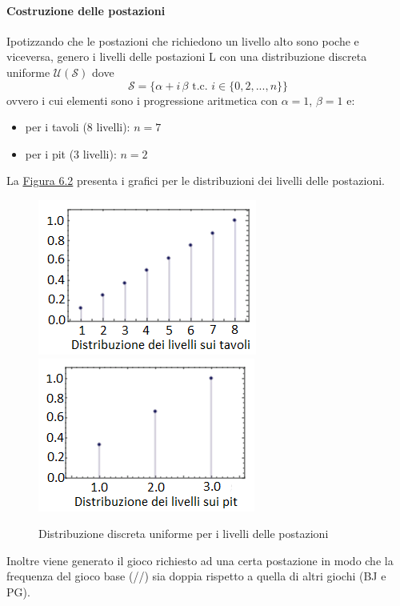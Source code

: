     \paragraph{Costruzione delle postazioni} Ipotizzando che le postazioni che richiedono un livello alto sono poche e viceversa, genero i livelli delle postazioni L con una distribuzione discreta uniforme $\mathcal{U}(\mathcal{S})$ dove \[\mathcal{S} = \{ \alpha + i \, \beta \text{ t.c. } i \in \{0,2,...,n\} \} \] ovvero i cui elementi sono i progressione aritmetica con $\alpha = 1$, $\beta = 1$ e:
    \begin{itemize}
        \item per i tavoli (8 livelli): $n = 7$
        \item per i pit (3 livelli): $n = 2$
    \end{itemize}
\noindent
    La \hyperref[fig62]{Figura 6.2} presenta i grafici per le distribuzioni dei livelli delle postazioni.
    \begin{figure}[!htb]
        \label{fig62}
        \begin{widepage}
            \centering
            \includegraphics[width=.49\textwidth]{../immagini/discr_livelli_tavoli.png}\hfil
            \includegraphics[width=.49\textwidth]{../immagini/discr_livelli_pit.png}
            \caption{Distribuzione discreta uniforme per i livelli delle postazioni}
        \end{widepage}
    \end{figure}
    \FloatBarrier
    \noindent
    Inoltre viene generato il gioco richiesto ad una certa postazione in modo che la frequenza del gioco base (//) sia doppia rispetto a quella di altri giochi (BJ e PG).\\
